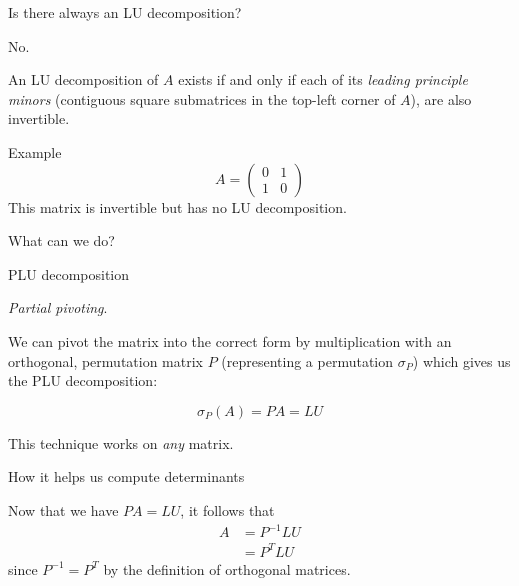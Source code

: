 \documentclass{beamer}
\begin{document}
\begin{frame}{Is there always an LU decomposition?}

    \alert{No.}

    An LU decomposition of $A$ exists if and only if each of its \emph{leading principle minors}
    (contiguous square submatrices in the top-left corner of $A$),
    are also invertible.

    \pause{}

    \begin{exampleblock}{Example}
        \[
            A= \begin{pmatrix}{}
                0 & 1 \\
                1 & 0
            \end{pmatrix}
        \]
        This matrix is invertible but has no LU decomposition.
    \end{exampleblock}

    \pause{}

    \begin{alertblock}{}
        What can we do?
    \end{alertblock}

\end{frame}

\begin{frame}{PLU decomposition}

    \emph{Partial pivoting}.

    We can pivot the matrix into the correct form by multiplication with
    an orthogonal, permutation matrix $P$ (representing a permutation $\sigma_P$)
    which gives us the PLU decomposition:

    \[
        \sigma_P(A) = PA = LU
    \]

    \pause{}

    \begin{block}{}
        This technique works on \emph{any} matrix.
    \end{block}

\end{frame}

\begin{frame}{How it helps us compute determinants}

    Now that we have $PA = LU$, it follows that
    \begin{align*}
        A &= P^{-1}LU \\
          &= P^T LU
    \end{align*}
    since $P^{-1} = P^T$ by the definition of orthogonal matrices.

\end{frame}
\end{document}
